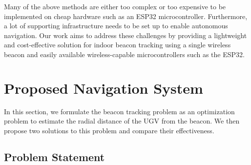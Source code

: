 \documentclass[conference]{IEEEtran}
\begin{document}
Many of the above methods are either too complex or too expensive to be
implemented on cheap hardware such as an ESP32 microcontroller. Furthermore, a
lot of supporting infrastructure needs to be set up to enable autonomous
navigation. Our work aims to address these challenges by providing a lightweight
and cost-effective solution for indoor beacon tracking using a single wireless
beacon and easily available wireless-capable microcontrollers such as the ESP32.

\section{Proposed Navigation System}
\label{sec:proposed-system}

In this section, we formulate the beacon tracking problem as an optimization
problem to estimate the radial distance of the UGV from the beacon. We then propose two solutions to this problem and compare their effectiveness.


\subsection{Problem Statement}
\label{subsec:problem-statement}
\end{document}
